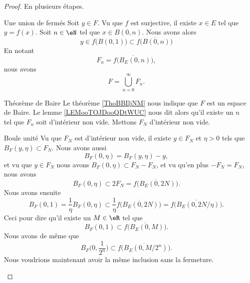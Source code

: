 \begin{proof}
    En plusieurs étapes.
    \begin{subproof}
    \item[Une union de fermés]
        Soit \( y\in F\). Vu que \( f\) est surjective, il existe \( x\in E\) tel que \( y=f(x)\). Soit \( n\in \eN\) tel que \( x\in B(0,n)\). Nous avons alors
        \begin{equation}
            y\in f\big( B(0,1) \big)\subset \overline{ f\big( B(0,n) \big) }
        \end{equation}
        En notant 
        \begin{equation}
            F_n=\overline{ f\big( B_E(0,n) \big) },
        \end{equation}
        nous avons
        \begin{equation}
            F=\bigcup_{n=0}^{\infty}F_n.
        \end{equation}
    \item[Théorème de Baire]
        Le théorème \ref{ThoBBIljNM} nous indique que \( F\) est un espace de Baire. Le lemme \ref{LEMooTOJDooQDtWUC} nous dit alors qu'il existe un \( n\) tel que \( F_n\) soit d'intérieur non vide. Mettons \( F_N\) d'intérieur non vide.
    \item[Boule unité]
        Vu que \( F_N\) est d'intérieur non vide, il existe \( y\in F_N\) et \( \eta>0\) tels que \( B_F(y,\eta)\subset F_N\). Nous avons aussi
        \begin{equation}
            B_F(0,\eta)=B_F(y,\eta)-y,
        \end{equation}
        et vu que \( y\in F_N\) nous avons \( B_F(0,\eta)\subset F_N-F_N\), et vu qu'en plus \( -F_N=F_N\), nous avons
        \begin{equation}
            B_F(0,\eta)\subset 2F_N=\overline{ f\big( B_E(0,2N) \big) }.
        \end{equation}
        Nous avons ensuite    
        \begin{equation}
            B_F(0,1)=\frac{1}{ \eta }B_F(0,\eta)\subset\frac{1}{ \eta }\overline{ f\big( B_E(0,2N) \big) }=\overline{ f\big( B_E(0,2N/\eta) \big) }.
        \end{equation}
        Ceci pour dire qu'il existe un \( M\in \eR\) tel que
        \begin{equation}
            B_F(0,1)\subset \overline{ f\big( B_E(0,M) \big) }.
        \end{equation}
        Nous avons de même que
        \begin{equation}        \label{EQooCMSPooYtzAuC}
            B_F\big( 0,\frac{1}{ 2^n } \big)\subset \overline{ f\big( B_E(0,M/2^n) \big) }.
        \end{equation}
        Nous voudrions maintenant avoir la même inclusion sans la fermeture.


\end{subproof}
\end{proof}
